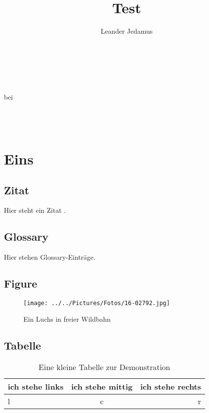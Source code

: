 \documentclass[ngermanb,12pt,twoside,openright,titlepage,numbers=noenddot,%
               headinclude,footinclude=true,BCOR=5mm]{scrreprt}
\title{Test}
\author{Leander Jedamus}
\begin{document}
  \begin{titlepage}
    \begin{center}
      \myTitle\\
      \mySubtitle\\
      \myDegree\myName\\
      bei \myProf\\
      \myUni\\
      \myLocation\\
      \myTime\\
      \myVersion
    \end{center}
\end{titlepage}

    \tableofcontents\cleardoublepage

  \maketitle

  \chapter{Eins}

    \section{Zitat}
      Hier steht ein Zitat \cite{cit:ljhj}. \\

    \section{Glossary}
      Hier stehen Glossary-Einträge. \\

    \section{Figure}
      \begin{figure}[h]
        \texttt{[image: ../../Pictures/Fotos/16-02792.jpg]}
	\caption[Luchs]{Ein Luchs in freier Wildbahn}
	\label{fig:luchs}
      \end{figure}

    \section{Tabelle}
      \begin{table}[h]
        \begin{tabular}{||l|c|r||}
          \hline
          \hline
          ich stehe links & ich stehe mittig & ich stehe rechts \\
          \hline
          l & c & r \\
          \hline
          \hline
        \end{tabular}
        \caption[Tabelle]{Eine kleine Tabelle zur Demonstration}
        \label{tab:demo}
      \end{table}
\end{document}
